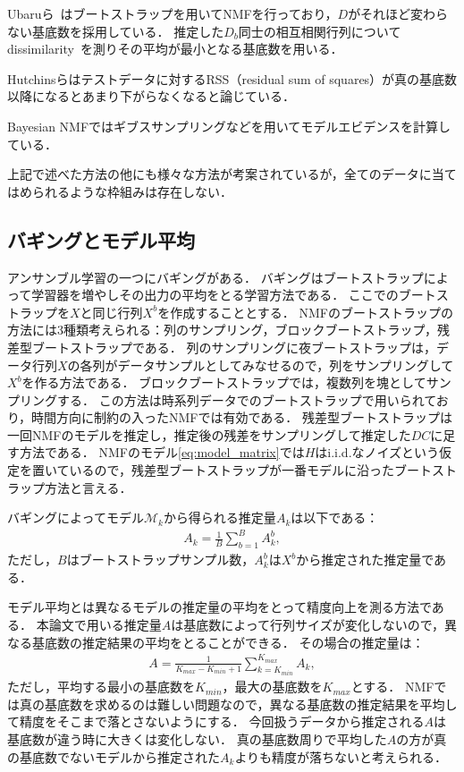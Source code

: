 Ubaruら~\cite{Ubaru2017}はブートストラップを用いてNMFを行っており，$D$がそれほど変わらない基底数を採用している．
推定した$D_b$同士の相互相関行列についてdissimilarity~\cite{Wu}を測りその平均が最小となる基底数を用いる．

Hutchinsらはテストデータに対するRSS（residual sum of squares）が真の基底数以降になるとあまり下がらなくなると論じている\cite{Hutchins2008}．

Bayesian NMFではギブスサンプリングなどを用いてモデルエビデンスを計算している\cite{Cemgil2009}．

上記で述べた方法の他にも様々な方法が考案されているが，全てのデータに当てはめられるような枠組みは存在しない．

\subsection{バギングとモデル平均}
アンサンブル学習の一つにバギング\cite{Breiman1996}がある．
バギングはブートストラップ\cite{Efron1979}によって学習器を増やしその出力の平均をとる学習方法である．
ここでのブートストラップを$X$と同じ行列$X^b$を作成することとする．
NMFのブートストラップの方法には3種類考えられる：列のサンプリング，ブロックブートストラップ，残差型ブートストラップである．
列のサンプリングに夜ブートストラップは，データ行列$X$の各列がデータサンプルとしてみなせるので，列をサンプリングして$X^b$を作る方法である．
ブロックブートストラップでは，複数列を塊としてサンプリングする．
この方法は時系列データでのブートストラップで用いられており，時間方向に制約の入ったNMFでは有効である．
残差型ブートストラップは一回NMFのモデルを推定し，推定後の残差をサンプリングして推定した$DC$に足す方法である．
NMFのモデル\eqref{eq:model_matrix}では$H$はi.i.d.なノイズという仮定を置いているので，残差型ブートストラップが一番モデルに沿ったブートストラップ方法と言える．

バギングによってモデル$\mathcal{M}_k$から得られる推定量$A_k$は以下である：
\begin{eqnarray}
	A_k = \frac{1}{B} \sum_{b=1}^B A_k^b,
\end{eqnarray}
ただし，$B$はブートストラップサンプル数，$A_k^b$は$X^b$から推定された推定量である．

モデル平均とは異なるモデルの推定量の平均をとって精度向上を測る方法である．
本論文で用いる推定量$A$は基底数によって行列サイズが変化しないので，異なる基底数の推定結果の平均をとることができる．
その場合の推定量は：
\begin{eqnarray}
	A = \frac{1}{K_{max} - K_{min} + 1} \sum_{k=K_{min}}^{K_{max}} A_k,
\end{eqnarray}
ただし，平均する最小の基底数を$K_{min}$，最大の基底数を$K_{max}$とする．
NMFでは真の基底数を求めるのは難しい問題なので，異なる基底数の推定結果を平均して精度をそこまで落とさないようにする．
今回扱うデータから推定される$A$は基底数が違う時に大きくは変化しない．
真の基底数周りで平均した$A$の方が真の基底数でないモデルから推定された$A_k$よりも精度が落ちないと考えられる．


